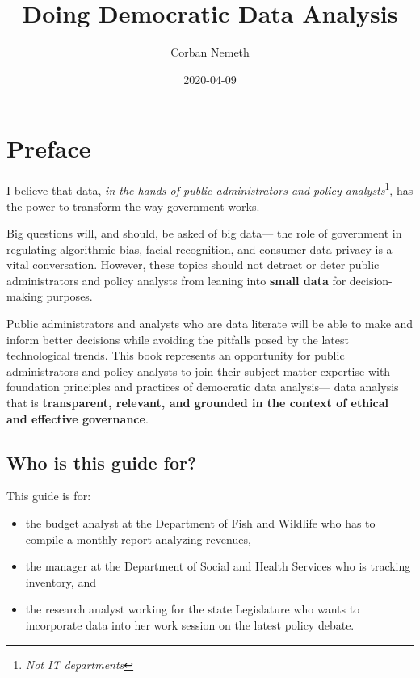 \documentclass[]{book}
\title{Doing Democratic Data Analysis}
\author{Corban Nemeth}
\date{2020-04-09}
\providecommand{\tightlist}{%
  \setlength{\itemsep}{0pt}\setlength{\parskip}{0pt}}
\begin{document}
\maketitle

{
\setcounter{tocdepth}{1}
\tableofcontents
}
\chapter*{Preface}\label{preface}

I believe that data, \emph{in the hands of public administrators and
policy analysts}\footnote{\emph{Not IT departments}}, has the power to
transform the way government works.

Big questions will, and should, be asked of big data--- the role of
government in regulating algorithmic bias, facial recognition, and
consumer data privacy is a vital conversation. However, these topics
should not detract or deter public administrators and policy analysts
from leaning into \textbf{small data} for decision-making purposes.

Public administrators and analysts who are data literate will be able to
make and inform better decisions while avoiding the pitfalls posed by
the latest technological trends. This book represents an opportunity for
public administrators and policy analysts to join their subject matter
expertise with foundation principles and practices of democratic data
analysis--- data analysis that is \textbf{transparent, relevant, and
grounded in the context of ethical and effective governance}.

\section*{Who is this guide for?}\label{who-is-this-guide-for}

This guide is for:

\begin{itemize}
\tightlist
\item
  the budget analyst at the Department of Fish and Wildlife who has to
  compile a monthly report analyzing revenues,
\item
  the manager at the Department of Social and Health Services who is
  tracking inventory, and
\item
  the research analyst working for the state Legislature who wants to
  incorporate data into her work session on the latest policy debate.
\end{itemize}
\end{document}
